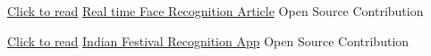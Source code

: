 

\begin{cventries}


  \cventry
    {\href{https://www.linkedin.com/pulse/real-time-face-recognition-using-facenet-ishwar-sawale/}{Click to read}} %
    {\href{https://www.linkedin.com/pulse/real-time-face-recognition-using-facenet-ishwar-sawale/}{Real time Face Recognition Article}} %
    {Open Source Contribution} %
    {} %
    {
      \begin{cvitems} %
      \end{cvitems}
    }

  \cventry
    {\href{https://goo.gl/LhiUZF}{Click to read}} %
    {\href{https://goo.gl/LhiUZF}{Indian Festival Recognition App}} %
    {Open Source Contribution} %
    {} %
    {
      \begin{cvitems} %
      \end{cvitems}
    }


\end{cventries}
